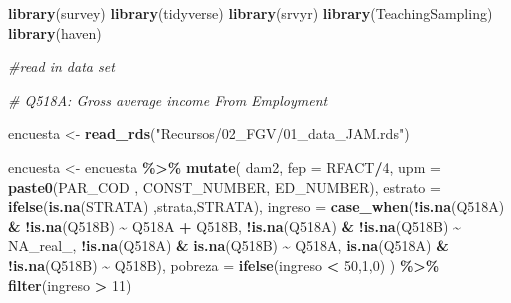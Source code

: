 \documentclass[
  12pt,
]{book}
\newenvironment{Shaded}{\begin{snugshade}}{\end{snugshade}}
\newcommand{\AttributeTok}[1]{\textcolor[rgb]{0.13,0.29,0.53}{#1}}
\newcommand{\CommentTok}[1]{\textcolor[rgb]{0.56,0.35,0.01}{\textit{#1}}}
\newcommand{\ConstantTok}[1]{\textcolor[rgb]{0.56,0.35,0.01}{#1}}
\newcommand{\DecValTok}[1]{\textcolor[rgb]{0.00,0.00,0.81}{#1}}
\newcommand{\FunctionTok}[1]{\textcolor[rgb]{0.13,0.29,0.53}{\textbf{#1}}}
\newcommand{\NormalTok}[1]{#1}
\newcommand{\OtherTok}[1]{\textcolor[rgb]{0.56,0.35,0.01}{#1}}
\newcommand{\SpecialCharTok}[1]{\textcolor[rgb]{0.81,0.36,0.00}{\textbf{#1}}}
\newcommand{\StringTok}[1]{\textcolor[rgb]{0.31,0.60,0.02}{#1}}
\begin{document}
\begin{Shaded}
\begin{Highlighting}[]
\FunctionTok{library}\NormalTok{(survey)}
\FunctionTok{library}\NormalTok{(tidyverse)}
\FunctionTok{library}\NormalTok{(srvyr)}
\FunctionTok{library}\NormalTok{(TeachingSampling)}
\FunctionTok{library}\NormalTok{(haven)}
 
\CommentTok{\#read in data set}

\CommentTok{\# Q518A: Gross average income From Employment}
  
\NormalTok{encuesta }\OtherTok{\textless{}{-}} \FunctionTok{read\_rds}\NormalTok{(}\StringTok{"Recursos/02\_FGV/01\_data\_JAM.rds"}\NormalTok{) }

\NormalTok{encuesta }\OtherTok{\textless{}{-}}
\NormalTok{  encuesta }\SpecialCharTok{\%\textgreater{}\%}
  \FunctionTok{mutate}\NormalTok{(}
\NormalTok{    dam2,}
    \AttributeTok{fep =}\NormalTok{ RFACT}\SpecialCharTok{/}\DecValTok{4}\NormalTok{,}
    \AttributeTok{upm =} \FunctionTok{paste0}\NormalTok{(PAR\_COD , CONST\_NUMBER, ED\_NUMBER),}
    \AttributeTok{estrato =} \FunctionTok{ifelse}\NormalTok{(}\FunctionTok{is.na}\NormalTok{(STRATA) ,strata,STRATA),}
    \AttributeTok{ingreso =} \FunctionTok{case\_when}\NormalTok{(}\SpecialCharTok{!}\FunctionTok{is.na}\NormalTok{(Q518A) }\SpecialCharTok{\&} \SpecialCharTok{!}\FunctionTok{is.na}\NormalTok{(Q518B) }\SpecialCharTok{\textasciitilde{}}\NormalTok{ Q518A }\SpecialCharTok{+}\NormalTok{ Q518B, }
                        \SpecialCharTok{!}\FunctionTok{is.na}\NormalTok{(Q518A) }\SpecialCharTok{\&} \SpecialCharTok{!}\FunctionTok{is.na}\NormalTok{(Q518B) }\SpecialCharTok{\textasciitilde{}} \ConstantTok{NA\_real\_}\NormalTok{,}
                        \SpecialCharTok{!}\FunctionTok{is.na}\NormalTok{(Q518A) }\SpecialCharTok{\&} \FunctionTok{is.na}\NormalTok{(Q518B) }\SpecialCharTok{\textasciitilde{}}\NormalTok{ Q518A,}
                        \FunctionTok{is.na}\NormalTok{(Q518A) }\SpecialCharTok{\&} \SpecialCharTok{!}\FunctionTok{is.na}\NormalTok{(Q518B) }\SpecialCharTok{\textasciitilde{}}\NormalTok{ Q518B),}
    \AttributeTok{pobreza =} \FunctionTok{ifelse}\NormalTok{(ingreso }\SpecialCharTok{\textless{}} \DecValTok{50}\NormalTok{,}\DecValTok{1}\NormalTok{,}\DecValTok{0}\NormalTok{)}
\NormalTok{  ) }\SpecialCharTok{\%\textgreater{}\%} \FunctionTok{filter}\NormalTok{(ingreso }\SpecialCharTok{\textgreater{}} \DecValTok{11}\NormalTok{)}
\end{Highlighting}
\end{Shaded}
\end{document}
